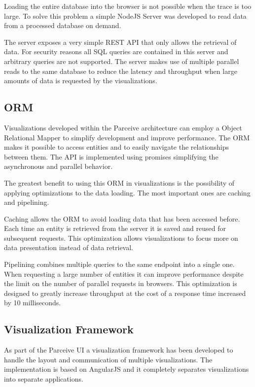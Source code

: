 Loading the entire database into the browser is not possible when the trace is too large. To solve this problem a simple NodeJS Server was developed to read data from a processed database on demand.

The server exposes a very simple REST \cite{rest} API that only allows the retrieval of data. For security reasons all SQL queries are contained in this server and  arbitrary queries are not supported. The server makes use of multiple parallel reads to the same database to reduce the latency and throughput when large amounts of data is requested by the visualizations.

\subsection{ORM}

Visualizations developed within the Parceive architecture can employ a Object Relational Mapper to simplify development and improve performance. The ORM makes it possible to access entities and to easily navigate the relationships between them. The API is implemented using promises \cite{promises} simplifying the asynchronous and parallel behavior.

The greatest benefit to using this ORM in visualizations is the possibility of applying optimizations to the data loading. The most important ones are caching and pipelining.

Caching allows the ORM to avoid loading data that has been accessed before. Each time an entity is retrieved from the server it is saved and reused for subsequent requests. This optimization allows visualizations to focus more on data presentation instead of data retrieval.

Pipelining combines multiple queries to the same endpoint into a single one. When requesting a large number of entities it can improve performance despite the limit on the number of parallel requests in browsers. This optimization is designed to greatly increase throughput at the cost of a response time increased by 10 milliseconds.

\subsection{Visualization Framework}

As part of the Parceive UI a visualization framework has been developed to handle the layout and communication of multiple visualizations. The implementation is based on AngularJS and it completely separates visualizations into separate applications.

